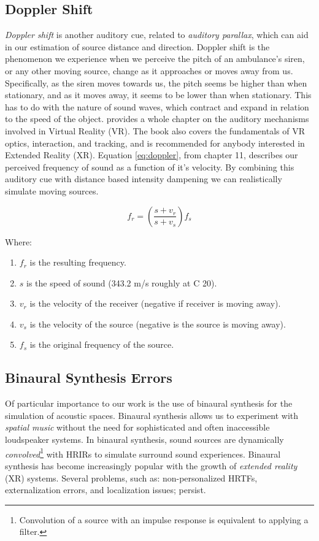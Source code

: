 \subsection{Doppler Shift}

\textit{Doppler shift} is another auditory cue, related to \textit{auditory parallax}, which can aid in our estimation of source distance and direction. Doppler shift is the phenomenon we experience when we perceive the pitch of an ambulance's siren, or any other moving source, change as it approaches or moves away from us. Specifically, as the siren moves towards us, the pitch seems be higher than when stationary, and as it moves away, it seems to be lower than when stationary. This has to do with the nature of sound waves, which contract and expand in relation to the speed of the object. \cite{lavalle2016virtual} provides a whole chapter on the auditory mechanisms involved in Virtual Reality (VR). The book also covers the fundamentals of VR optics, interaction, and tracking, and is recommended for anybody interested in Extended Reality (XR). Equation \ref{eq:doppler}, from chapter 11, describes our perceived frequency of sound as a function of it's velocity. By combining this auditory cue with distance based intensity dampening we can realistically simulate moving sources.

\begin{equation}
f_{r}=\left(\frac{s+v_{r}}{s+v_{s}}\right) f_{s}
\label{eq:doppler}
\end{equation}

Where: 
\begin{enumerate}
    \item $f_r$ is the resulting frequency.
    \item $s$ is the speed of sound (343.2 m/s roughly at C 20\textdegree).
    \item $v_r$ is the velocity of the receiver (negative if receiver is moving away). 
    \item $v_s$ is the velocity of the source (negative is the source is moving away).
    \item $f_s$ is the original frequency of the source.
\end{enumerate}

\subsection{Binaural Synthesis Errors}

Of particular importance to our work is the use of binaural synthesis for the simulation of acoustic spaces. Binaural synthesis allows us to experiment with \textit{spatial music} without the need for sophisticated and often inaccessible loudspeaker systems. In binaural synthesis, sound sources are dynamically \textit{convolved}\footnote{Convolution of a source with an impulse response is equivalent to applying a filter.} with HRIRs to simulate surround sound experiences. Binaural synthesis has become increasingly popular with the growth of \textit{extended reality} (XR) systems. Several problems, such as: non-personalized HRTFs, externalization errors, and localization issues; persist. 


